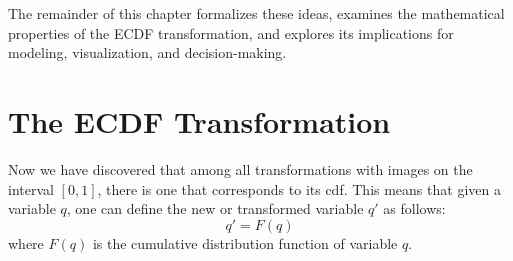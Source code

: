 The remainder of this chapter formalizes these ideas, examines the mathematical properties of the ECDF transformation, and explores its implications for modeling, visualization, and decision-making.

\section{The ECDF Transformation}
Now we have discovered that among all transformations with images on the interval $[0,1]$, there is one that corresponds to its cdf. This means that given a variable $q$, one can define the new or transformed variable $q'$ as follows:
\begin{equation}
q' = F(q)
\label{eq:cdftransform}
\end{equation}
where $F(q)$ is the cumulative distribution function of variable $q$.

